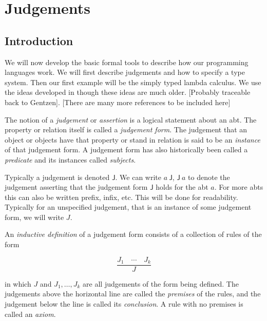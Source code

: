 \section{Judgements}

\subsection{Introduction}

We will now develop the basic formal tools to describe how our programming languages work.  We will first describe judgements and how to specify a type system. Then our first example will be the simply typed lambda calculus. We use the ideas developed in \cite{harper_2016} though these ideas are much older. [Probably traceable back to Gentzen]. [There are many more references to be included here]

\begin{defin}
    The notion of a \emph{judgement} or \emph{assertion} is a logical statement about an abt. The property or relation itself is called a \emph{judgement form}. The judgement that an object or objects have that property or stand in relation is said to be an \emph{instance} of that judgement form. A judgement form has also historically been called a \emph{predicate} and its instances called \emph{subjects}.
\end{defin}

\begin{remark}
    Typically a judgement is denoted $\mathsf{J}$. We can write $a\ \mathsf{J}$, $\mathsf{J}\ a$ to denote the judgement asserting that the judgement form $\mathsf{J}$ holds for the abt $a$. For more abts this can also be written prefix, infix, etc. This will be done for readability. Typically for an unspecified judgement, that is an instance of some judgement form, we will write $J$.
\end{remark}

\begin{defin}
    An \emph{inductive definition} of a judgement form consists of a collection of rules of the form
    
    $$\frac
        {J_1 \quad \cdots \quad J_k}
        {J}
    $$
    
    in which $J$ and $J_1, \dots , J_k$ are all judgements of the form being defined. The judgements above the horizontal line are called the \emph{premises} of the rules, and the judgement below the line is called its \emph{conclusion}. A rule with no premises is called an \emph{axiom}.
\end{defin}

